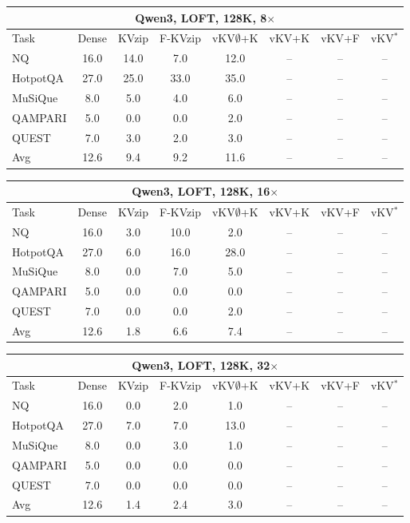 \begin{tabular}{lccccccc}
\toprule
\multicolumn{8}{c}{Qwen3, LOFT, 128K, 8$\times$} \\
\midrule
Task & Dense & KVzip & F-KVzip & vKV$\emptyset$+K & vKV+K & vKV+F & vKV$^\ast$ \\
\midrule
NQ & 16.0 & 14.0 & 7.0 & 12.0 & -- & -- & -- \\
HotpotQA & 27.0 & 25.0 & 33.0 & 35.0 & -- & -- & -- \\
MuSiQue & 8.0 & 5.0 & 4.0 & 6.0 & -- & -- & -- \\
QAMPARI & 5.0 & 0.0 & 0.0 & 2.0 & -- & -- & -- \\
QUEST & 7.0 & 3.0 & 2.0 & 3.0 & -- & -- & -- \\
\midrule
Avg & 12.6 & 9.4 & 9.2 & 11.6 & -- & -- & -- \\
\bottomrule
\end{tabular}
\vspace{0.8em}

\begin{tabular}{lccccccc}
\toprule
\multicolumn{8}{c}{Qwen3, LOFT, 128K, 16$\times$} \\
\midrule
Task & Dense & KVzip & F-KVzip & vKV$\emptyset$+K & vKV+K & vKV+F & vKV$^\ast$ \\
\midrule
NQ & 16.0 & 3.0 & 10.0 & 2.0 & -- & -- & -- \\
HotpotQA & 27.0 & 6.0 & 16.0 & 28.0 & -- & -- & -- \\
MuSiQue & 8.0 & 0.0 & 7.0 & 5.0 & -- & -- & -- \\
QAMPARI & 5.0 & 0.0 & 0.0 & 0.0 & -- & -- & -- \\
QUEST & 7.0 & 0.0 & 0.0 & 2.0 & -- & -- & -- \\
\midrule
Avg & 12.6 & 1.8 & 6.6 & 7.4 & -- & -- & -- \\
\bottomrule
\end{tabular}
\vspace{0.8em}

\begin{tabular}{lccccccc}
\toprule
\multicolumn{8}{c}{Qwen3, LOFT, 128K, 32$\times$} \\
\midrule
Task & Dense & KVzip & F-KVzip & vKV$\emptyset$+K & vKV+K & vKV+F & vKV$^\ast$ \\
\midrule
NQ & 16.0 & 0.0 & 2.0 & 1.0 & -- & -- & -- \\
HotpotQA & 27.0 & 7.0 & 7.0 & 13.0 & -- & -- & -- \\
MuSiQue & 8.0 & 0.0 & 3.0 & 1.0 & -- & -- & -- \\
QAMPARI & 5.0 & 0.0 & 0.0 & 0.0 & -- & -- & -- \\
QUEST & 7.0 & 0.0 & 0.0 & 0.0 & -- & -- & -- \\
\midrule
Avg & 12.6 & 1.4 & 2.4 & 3.0 & -- & -- & -- \\
\bottomrule
\end{tabular}
\vspace{0.8em}

